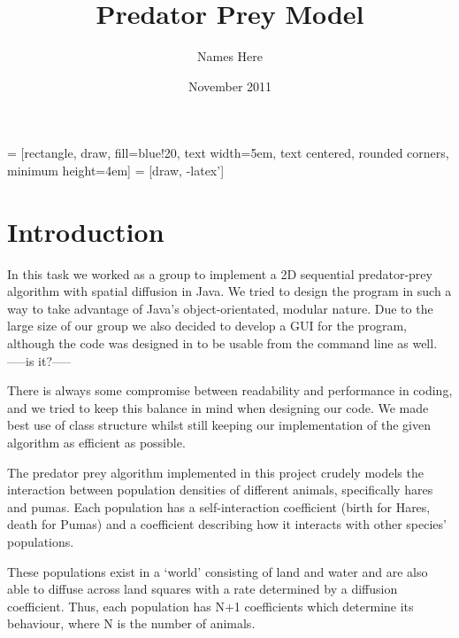 \documentclass[11pt]{report}
\title{Predator Prey Model}
\author{Names Here}
\date{November 2011}
\begin{document}
\usetikzlibrary{shapes,arrows}


 = [rectangle, draw, fill=blue!20, 
    text width=5em, text centered, rounded corners, minimum height=4em]
 = [draw, -latex']

\maketitle

\begin{abstract}
\end{abstract}

\tableofcontents

\chapter{Introduction}


In this task we worked as a group to implement a 2D sequential predator-prey algorithm with spatial diffusion
in Java. We tried to design the program in such a way to take advantage of Java's object-orientated, modular nature. 
Due to the large size of our group we also decided to develop a GUI for the program, although the code was designed 
in to be usable from the command line as well. -----is it?-----\newline{}

There is always some compromise between readability and performance in coding, and we tried to keep this balance in mind
when designing our code. We made best use of class structure whilst still keeping our implementation of the given 
algorithm as efficient as possible.\newline{}

The predator prey algorithm implemented in this project crudely models the interaction between population densities of different animals, specifically hares and pumas. Each population has a self-interaction coefficient (birth for Hares, death for Pumas) and a coefficient describing how it interacts with other species' populations. \newline{}

These populations exist in a `world' consisting of land and water and are also able to diffuse across land squares with a rate determined by a diffusion coefficient. Thus, each population has N+1 coefficients which determine its behaviour, where N is the number of animals.
\end{document}
